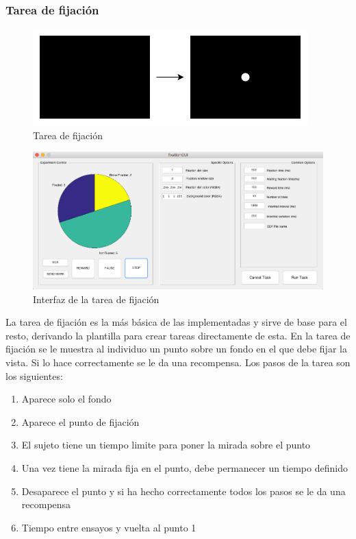 \documentclass[conference]{IEEEtran}
\begin{document}
\subsubsection*{Tarea de fijación}

\begin{figure}[htbp]
\centerline{\includegraphics[width=\linewidth]{figures/fixation}}
\caption{Tarea de fijación}
\label{figfixTask}
\end{figure}

\begin{figure}[htbp]
\centerline{\includegraphics[width=\linewidth]{figures/fixation_gui}}
\caption{Interfaz de la tarea de fijación}
\label{figfixGUI}
\end{figure}

La tarea de fijación es la más básica de las implementadas y sirve de base para el resto, derivando la plantilla para crear tareas directamente de esta. 
En la tarea de fijación se le muestra al individuo un punto sobre un fondo en el que debe fijar la vista. Si lo hace correctamente se le da una recompensa.
Los pasos de la tarea son los siguientes:

\begin{enumerate}
	\item Aparece solo el fondo
	\item Aparece el punto de fijación
	\item El sujeto tiene un tiempo limite para poner la mirada sobre el punto
	\item Una vez tiene la mirada fija en el punto, debe permanecer un tiempo definido
	\item Desaparece el punto y si ha hecho correctamente todos los pasos se le da una recompensa
	\item Tiempo entre ensayos y vuelta al punto 1
\end{enumerate}
\end{document}
